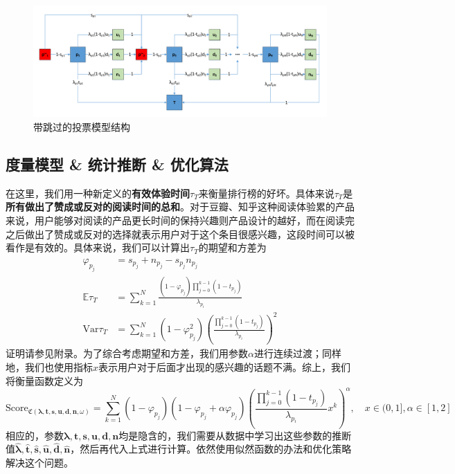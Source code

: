 \documentclass[UTF8]{ctexart}
\theoremstyle{plain}
\theoremstyle{definition}
\theoremstyle{remark}
\begin{document}
	\begin{figure}[h!]
		\centering
		\includegraphics[width = 12cm]{modelC_fig_2.pdf}
		\caption{带跳过的投票模型结构}\label{modelC_fig_2}
	\end{figure}
	
	\subsection{度量模型 \& 统计推断 \& 优化算法}
	在这里，我们用一种新定义的\textbf{有效体验时间}$\tau_T$来衡量排行榜的好坏。具体来说$\tau_T$是\textbf{所有做出了赞成或反对的阅读时间的总和}。对于豆瓣、知乎这种阅读体验累的产品来说，用户能够对阅读的产品更长时间的保持兴趣则产品设计的越好，而在阅读完之后做出了赞成或反对的选择就表示用户对于这个条目很感兴趣，这段时间可以被看作是有效的。具体来说，我们可以计算出$\tau_T$的期望和方差为
	\begin{equation} \label{EQ_C}
	\begin{aligned}
	\varphi_{p_j} & = s_{p_j} + n_{p_j} - s_{p_j}n_{p_j} \\
	\mathbb{E} \tau_T & = \sum_{k=1}^N \frac{(1-\varphi_{p_j})\prod\limits_{j=0}^{k-1}(1-t_{p_j})}{\lambda_{p_i}} \\
	\mathrm{Var} \tau_T & = \sum_{k=1}^N (1-\varphi_{p_j}^2)\left(\frac{\prod\limits_{j=0}^{k-1}(1-t_{p_j})}{\lambda_{p_i}}\right)^2
	\end{aligned}
	\end{equation}
	证明请参见附录。为了综合考虑期望和方差，我们用参数$\alpha$进行连续过渡；同样地，我们也使用指标$x$表示用户对于后面才出现的感兴趣的话题不满。综上，我们将衡量函数定义为
	\begin{equation}
	\mathrm{Score}_{\mathfrak{C}\left(\bm{\lambda}, \bm{t}, \bm{s}, \bm{u}, \bm{d}, \bm{n},\omega\right)} = \sum_{k=1}^N (1-\varphi_{p_j})(1-\varphi_{p_j}+\alpha \varphi_{p_j})\left(\frac{\prod\limits_{j=0}^{k-1}(1-t_{p_j})}{\lambda_{p_i}} x^k\right)^\alpha, \quad x \in (0, 1], \alpha \in [1, 2]
	\end{equation}
	相应的，参数$\bm{\lambda}, \bm{t}, \bm{s}, \bm{u}, \bm{d}, \bm{n}$均是隐含的，我们需要从数据中学习出这些参数的推断值$\bm{\hat{\lambda}}, \bm{\hat{t}}, \bm{\hat{s}}, \bm{\hat{u}}, \bm{\hat{d}}, \bm{\hat{n}}$，然后再代入上式进行计算。依然使用似然函数的办法和优化策略解决这个问题。 \\
	
\end{document}

